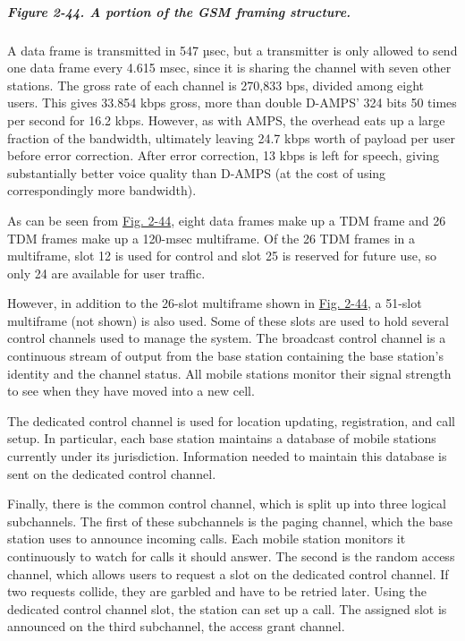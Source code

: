 \documentclass[b5paper,11pt]{memoir}
\begin{document}
\subparagraph[Figure 2-44. A portion of the GSM framing
structure.]{\texorpdfstring{\protect\hypertarget{0130661023_ch02lev1sec6.htmlux5cux23ch02fig44}{}{}Figure
2-44. A portion of the GSM framing
structure.}{Figure 2-44. A portion of the GSM framing structure.}}


A data frame is transmitted in 547 µsec, but a transmitter is only
allowed to send one data frame every 4.615 msec, since it is sharing the
channel with seven other stations. The gross rate of each channel is
270,833 bps, divided among eight users. This gives 33.854 kbps gross,
more than double D-AMPS' 324 bits 50 times per second for 16.2 kbps.
However, as with AMPS, the overhead eats up a large fraction of the
bandwidth, ultimately leaving 24.7 kbps worth of payload per user before
error correction. After error correction, 13 kbps is left for speech,
giving substantially better voice quality than D-AMPS (at the cost of
using correspondingly more bandwidth).

As can be seen from
\protect\hyperlink{0130661023_ch02lev1sec6.htmlux5cux23ch02fig44}{Fig.
2-44}, eight data frames make up a TDM frame and 26 TDM frames make up a
120-msec multiframe. Of the 26 TDM frames in a multiframe, slot 12 is
used for control and slot 25 is reserved for future use, so only 24 are
available for user traffic.

However, in addition to the 26-slot multiframe shown in
\protect\hyperlink{0130661023_ch02lev1sec6.htmlux5cux23ch02fig44}{Fig.
2-44}, a 51-slot multiframe (not shown) is also used. Some of these
slots are used to hold several control channels used to manage the
system. The {broadcast control channel} is a continuous stream of output
from the base station containing the base station's identity and the
channel status. All mobile stations monitor their signal strength to see
when they have moved into a new cell.

The {dedicated control channel} is used for location updating,
registration, and call setup. In particular, each base station maintains
a database of mobile stations currently under its jurisdiction.
Information needed to maintain this database is sent on the dedicated
control channel.

Finally, there is the {common control channel}, which is split up into
three logical subchannels. The first of these subchannels is the {paging
channel}, which the base station uses to announce incoming calls. Each
mobile station monitors it continuously to watch for calls it should
answer. The second is the {random access channel}, which allows users to
request a slot on the dedicated control channel. If two requests
collide, they are garbled and have to be retried later. Using the
dedicated control channel slot, the station can set up a call. The
assigned slot is announced on the third subchannel, the {access grant
channel}.
\end{document}
